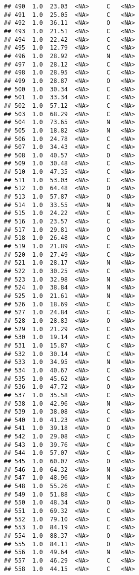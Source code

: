 \documentclass[
]{article}
\begin{document}
\begin{verbatim}
## 490  1.0  23.03  <NA>     C   <NA>
## 491  1.0  25.05  <NA>     C   <NA>
## 492  1.0  36.11  <NA>     O   <NA>
## 493  1.0  21.51  <NA>     C   <NA>
## 494  1.0  22.42  <NA>     C   <NA>
## 495  1.0  12.79  <NA>     C   <NA>
## 496  1.0  28.92  <NA>     N   <NA>
## 497  1.0  28.12  <NA>     C   <NA>
## 498  1.0  28.95  <NA>     C   <NA>
## 499  1.0  28.87  <NA>     O   <NA>
## 500  1.0  30.34  <NA>     C   <NA>
## 501  1.0  33.34  <NA>     C   <NA>
## 502  1.0  57.12  <NA>     C   <NA>
## 503  1.0  68.29  <NA>     C   <NA>
## 504  1.0  73.65  <NA>     N   <NA>
## 505  1.0  18.82  <NA>     N   <NA>
## 506  1.0  24.78  <NA>     C   <NA>
## 507  1.0  34.43  <NA>     C   <NA>
## 508  1.0  40.57  <NA>     O   <NA>
## 509  1.0  30.48  <NA>     C   <NA>
## 510  1.0  47.35  <NA>     C   <NA>
## 511  1.0  53.03  <NA>     C   <NA>
## 512  1.0  64.48  <NA>     O   <NA>
## 513  1.0  57.87  <NA>     O   <NA>
## 514  1.0  33.55  <NA>     N   <NA>
## 515  1.0  24.22  <NA>     C   <NA>
## 516  1.0  23.57  <NA>     C   <NA>
## 517  1.0  29.81  <NA>     O   <NA>
## 518  1.0  26.48  <NA>     C   <NA>
## 519  1.0  21.89  <NA>     C   <NA>
## 520  1.0  27.49  <NA>     C   <NA>
## 521  1.0  28.17  <NA>     N   <NA>
## 522  1.0  30.25  <NA>     C   <NA>
## 523  1.0  32.98  <NA>     N   <NA>
## 524  1.0  38.84  <NA>     N   <NA>
## 525  1.0  21.61  <NA>     N   <NA>
## 526  1.0  18.69  <NA>     C   <NA>
## 527  1.0  24.84  <NA>     C   <NA>
## 528  1.0  28.83  <NA>     O   <NA>
## 529  1.0  21.29  <NA>     C   <NA>
## 530  1.0  19.14  <NA>     C   <NA>
## 531  1.0  15.87  <NA>     C   <NA>
## 532  1.0  30.14  <NA>     C   <NA>
## 533  1.0  34.95  <NA>     N   <NA>
## 534  1.0  40.67  <NA>     C   <NA>
## 535  1.0  45.62  <NA>     C   <NA>
## 536  1.0  47.72  <NA>     O   <NA>
## 537  1.0  35.58  <NA>     C   <NA>
## 538  1.0  42.96  <NA>     N   <NA>
## 539  1.0  38.08  <NA>     C   <NA>
## 540  1.0  41.23  <NA>     C   <NA>
## 541  1.0  39.18  <NA>     O   <NA>
## 542  1.0  29.08  <NA>     C   <NA>
## 543  1.0  39.76  <NA>     C   <NA>
## 544  1.0  57.07  <NA>     C   <NA>
## 545  1.0  60.07  <NA>     O   <NA>
## 546  1.0  64.32  <NA>     N   <NA>
## 547  1.0  48.96  <NA>     N   <NA>
## 548  1.0  55.26  <NA>     C   <NA>
## 549  1.0  51.88  <NA>     C   <NA>
## 550  1.0  48.34  <NA>     O   <NA>
## 551  1.0  69.32  <NA>     C   <NA>
## 552  1.0  79.10  <NA>     C   <NA>
## 553  1.0  84.19  <NA>     C   <NA>
## 554  1.0  88.37  <NA>     O   <NA>
## 555  1.0  84.11  <NA>     O   <NA>
## 556  1.0  49.64  <NA>     N   <NA>
## 557  1.0  46.29  <NA>     C   <NA>
## 558  1.0  44.15  <NA>     C   <NA>

\end{verbatim}
\end{document}
